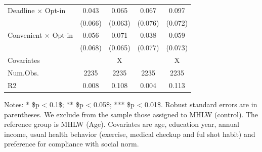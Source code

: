 \documentclass[
]{article}
\begin{document}
\begin{table}
\begin{threeparttable}
\begin{tabular}[t]{lcccc}
Deadline $\times$ Opt-in & \num{0.043} & \num{0.065} & \num{0.067} & \num{0.097}\\
 & (\num{0.066}) & (\num{0.063}) & (\num{0.076}) & (\num{0.072})\\
Convenient $\times$ Opt-in & \num{0.056} & \num{0.071} & \num{0.038} & \num{0.059}\\
 & (\num{0.068}) & (\num{0.065}) & (\num{0.077}) & (\num{0.073})\\
\midrule
Covariates &  & X &  & X\\
Num.Obs. & \num{2235} & \num{2235} & \num{2235} & \num{2235}\\
R2 & \num{0.008} & \num{0.108} & \num{0.004} & \num{0.113}\\
\bottomrule
\end{tabular}
\begin{tablenotes}
\item Notes: * \$p < 0.1\$; ** \$p < 0.05\$; *** \$p < 0.01\$. Robust standard errors are in parentheses. We exclude from the sample those assigned to MHLW (control). The reference group is MHLW (Age). Covariates are age, education year, annual income, usual health behavior (exercise, medical checkup and ful shot habit) and preference for compliance with social norm.
\end{tablenotes}
\end{threeparttable}
\end{table}
\end{document}
